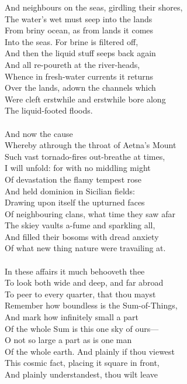 And neighbours on the seas, girdling their shores,\\
The water's wet must seep into the lands\\
From briny ocean, as from lands it comes\\
Into the seas. For brine is filtered off,\\
And then the liquid stuff seeps back again\\
And all re-poureth at the river-heads,\\
Whence in fresh-water currents it returns\\
Over the lands, adown the channels which\\
Were cleft erstwhile and erstwhile bore along\\
The liquid-footed floods.\\
\\
And now the cause\\
Whereby athrough the throat of Aetna's Mount\\
Such vast tornado-fires out-breathe at times,\\
I will unfold: for with no middling might\\
Of devastation the flamy tempest rose\\
And held dominion in Sicilian fields:\\
Drawing upon itself the upturned faces\\
Of neighbouring clans, what time they saw afar\\
The skiey vaults a-fume and sparkling all,\\
And filled their bosoms with dread anxiety\\
Of what new thing nature were travailing at.\\
\\
In these affairs it much behooveth thee\\
To look both wide and deep, and far abroad\\
To peer to every quarter, that thou mayst\\
Remember how boundless is the Sum-of-Things,\\
And mark how infinitely small a part\\
Of the whole Sum is this one sky of ours—\\
O not so large a part as is one man\\
Of the whole earth. And plainly if thou viewest\\
This cosmic fact, placing it square in front,\\
And plainly understandest, thou wilt leave\\
